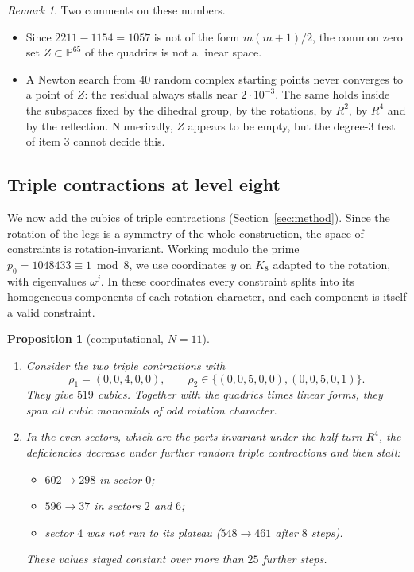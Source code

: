 \documentclass[11pt]{amsart}
\newtheorem{proposition}[theorem]{Proposition}
\theoremstyle{definition}
\theoremstyle{remark}
\newtheorem{remark}[theorem]{Remark}
\theoremstyle{plain}
\numberwithin{equation}{section}
\numberwithin{table}{section}
\begin{document}
\begin{remark}
Two comments on these numbers.
\begin{itemize}
\item Since $2211-1154=1057$ is not of the form $m(m+1)/2$, the common zero set $Z\subset\mathbb P^{65}$ of the quadrics is not a linear space.
\item A Newton search from $40$ random complex starting points never converges to a point of $Z$: the residual always stalls near $2\cdot10^{-3}$. The same holds inside the subspaces fixed by the dihedral group, by the rotations, by $R^2$, by $R^4$ and by the reflection. Numerically, $Z$ appears to be empty, but the degree-$3$ test of item 3 cannot decide this.
\end{itemize}
\end{remark}

\subsection{Triple contractions at level eight}

We now add the cubics of triple contractions (Section~\ref{sec:method}). Since the rotation of the legs is a symmetry of the whole construction, the space of constraints is rotation-invariant. Working modulo the prime $p_0=1048433\equiv1\bmod8$, we use coordinates $y$ on $K_8$ adapted to the rotation, with eigenvalues $\omega^j$. In these coordinates every constraint splits into its homogeneous components of each rotation character, and each component is itself a valid constraint.

\begin{proposition}[computational, $N=11$]\label{prop:tripleeight}
\begin{enumerate}
\item Consider the two triple contractions with
\[
\rho_1=(0,0,4,0,0),\qquad\rho_2\in\{(0,0,5,0,0),(0,0,5,0,1)\}.
\]
They give $519$ cubics. Together with the quadrics times linear forms, they span all cubic monomials of odd rotation character.
\item In the even sectors, which are the parts invariant under the half-turn $R^4$, the deficiencies decrease under further random triple contractions and then stall:
\begin{itemize}
\item $602\to298$ in sector $0$;
\item $596\to37$ in sectors $2$ and $6$;
\item sector $4$ was not run to its plateau ($548\to461$ after $8$ steps).
\end{itemize}
These values stayed constant over more than $25$ further steps.
\end{enumerate}
\end{proposition}
\end{document}
